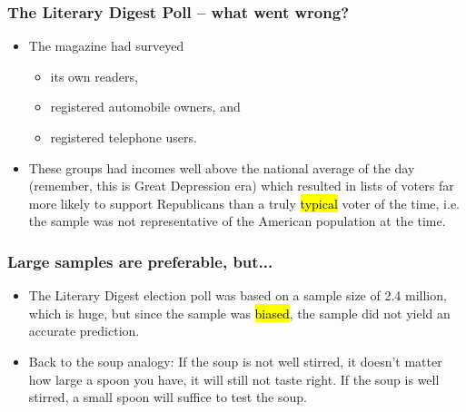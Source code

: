 \documentclass[11pt,containsverbatim,handout]{beamer}
\begin{document}

\begin{frame}
	\frametitle{The Literary Digest Poll -- what went wrong?}

	\begin{itemize}
		\item The magazine had surveyed
		\begin{itemize}
			\item its own readers,
			\item registered automobile owners, and
			\item registered telephone users.
		\end{itemize}
		\item These groups had incomes well above the national average of the day (remember, this is Great Depression era) which resulted in lists of voters far more likely to support Republicans than a truly \hl{typical} voter of the time, i.e. the sample was not representative of the American population at the time.
	\end{itemize}

\end{frame}


\begin{frame}

	\frametitle{Large samples are preferable, but...}

	\begin{itemize}
		\item The Literary Digest election poll was based on a sample size of 2.4 million, which is huge, but since the sample was \hl{biased}, the sample did not yield an accurate prediction.
		\item Back to the soup analogy: If the soup is not well stirred, it doesn't matter how large a spoon you have, it will still not taste right. If the soup is well stirred, a small spoon will suffice to test the soup.
	\end{itemize}

\end{frame}



\end{document}
